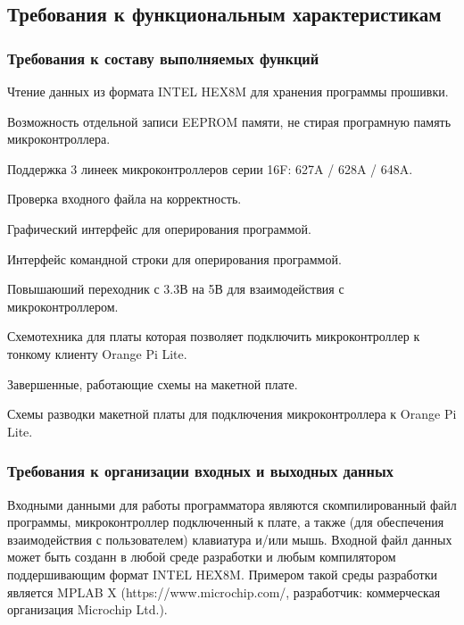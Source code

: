 

\subsection{Требования к функциональным характеристикам}
\subsubsection{Требования к составу выполняемых функций}
\begin{my_enumerate}
\item Чтение данных из формата INTEL HEX8M для хранения программы прошивки.
\item Возможность отдельной записи EEPROM памяти, не стирая програмную память микроконтроллера.
\item Поддержка 3 линеек микроконтроллеров серии 16F: 627A / 628A / 648A.
\item Проверка входного файла на корректность.
\item Графический интерфейс для оперирования программой.
\item Интерфейс командной строки для оперирования программой.
\item Повышаюший переходник с 3.3В на 5В для взаимодействия с микроконтроллером.
\item Схемотехника для платы которая позволяет подключить микроконтроллер к тонкому клиенту Orange Pi Lite.
\item Завершенные, работающие схемы на макетной плате.
\item Схемы разводки макетной платы для подключения микроконтроллера к Orange Pi Lite. 
\end{my_enumerate}

\subsubsection{Требования к организации входных и выходных данных}
Входными данными для работы программатора являются скомпилированный файл программы, микроконтроллер подключенный к плате, а также (для обеспечения взаимодействия с пользователем) клавиатура и/или мышь. Входной файл данных может быть созданн в любой среде разработки и любым компилятором поддершивающим формат INTEL HEX8M. Примером такой среды разработки является MPLAB X (https://www.microchip.com/, разработчик: коммерческая организация Microchip Ltd.).

